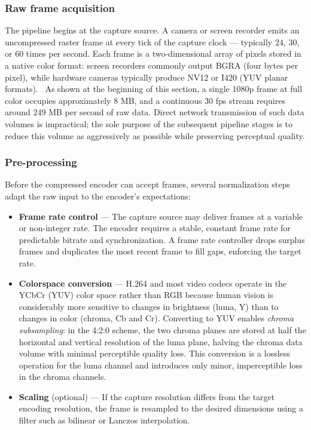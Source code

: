 \subsubsection{Raw frame acquisition}
The pipeline begins at the capture source. A camera or screen recorder emits an uncompressed raster frame at every tick of the capture clock — typically 24, 30, or 60 times per second. Each frame is a two-dimensional array of pixels stored in a native color format: screen recorders commonly output BGRA (four bytes per pixel), while hardware cameras typically produce NV12 or I420 (YUV planar formats).~\cite{WebVideoCodec2025} As shown at the beginning of this section, a single 1080p frame at full color occupies approximately 8 MB, and a continuous 30 fps stream requires around 249 MB per second of raw data. Direct network transmission of such data volumes is impractical; the sole purpose of the subsequent pipeline stages is to reduce this volume as aggressively as possible while preserving perceptual quality.

\subsubsection{Pre-processing}
Before the compressed encoder can accept frames, several normalization steps adapt the raw input to the encoder's expectations:
\begin{itemize}
    \item \textbf{Frame rate control} --- The capture source may deliver frames at a variable or non-integer rate. The encoder requires a stable, constant frame rate for predictable bitrate and synchronization. A frame rate controller drops surplus frames and duplicates the most recent frame to fill gaps, enforcing the target rate.~\cite{apostolopoulosVideoStreamingConcepts}
    \item \textbf{Colorspace conversion} --- H.264 and most video codecs operate in the YCbCr (YUV) color space rather than RGB because human vision is considerably more sensitive to changes in brightness (luma, Y) than to changes in color (chroma, Cb and Cr). Converting to YUV enables \textit{chroma subsampling}: in the 4:2:0 scheme, the two chroma planes are stored at half the horizontal and vertical resolution of the luma plane, halving the chroma data volume with minimal perceptible quality loss. This conversion is a lossless operation for the luma channel and introduces only minor, imperceptible loss in the chroma channels.~\cite{WebVideoCodec2025,apostolopoulosVideoStreamingConcepts}
    \item \textbf{Scaling} (optional) --- If the capture resolution differs from the target encoding resolution, the frame is resampled to the desired dimensions using a filter such as bilinear or Lanczos interpolation.~\cite{apostolopoulosVideoStreamingConcepts}
\end{itemize}


